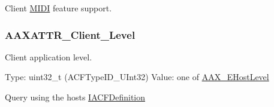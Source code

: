 Client \hyperlink{a00336}{M\+I\+D\+I} feature support. 

\hypertarget{a00299_a1bbc82d62cf23079e92826874381a891}{}
\subsubsection[{A\+A\+X\+A\+T\+T\+R\+\_\+\+Client\+\_\+\+Level}]{\setlength{\rightskip}{0pt plus 5cm}A\+A\+X\+A\+T\+T\+R\+\_\+\+Client\+\_\+\+Level}\label{a00299_a1bbc82d62cf23079e92826874381a891}


Client application level. 

Type\+: {\ttfamily uint32\+\_\+t} ({\ttfamily A\+C\+F\+Type\+I\+D\+\_\+\+U\+Int32}) Value\+: one of \hyperlink{a00206_a2d34e7a7c2e6f4f6361555ad02869219}{A\+A\+X\+\_\+\+E\+Host\+Level}

Query using the host\textquotesingle{}s \hyperlink{a00145}{I\+A\+C\+F\+Definition} 